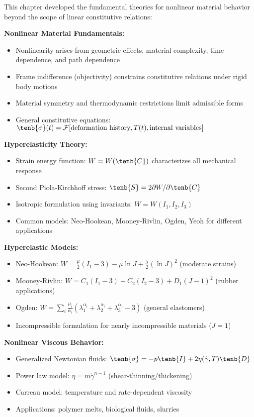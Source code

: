\begin{subox}[Summary]
This chapter developed the fundamental theories for nonlinear material behavior beyond the scope of linear constitutive relations:

\textbf{Nonlinear Material Fundamentals:}
\begin{itemize}
\item Nonlinearity arises from geometric effects, material complexity, time dependence, and path dependence
\item Frame indifference (objectivity) constrains constitutive relations under rigid body motions
\item Material symmetry and thermodynamic restrictions limit admissible forms
\item General constitutive equations: $\tenb{\sigma}(t) = \mathcal{F}[\text{deformation history}, T(t), \text{internal variables}]$
\end{itemize}

\textbf{Hyperelasticity Theory:}
\begin{itemize}
\item Strain energy function: $W = W(\tenb{C})$ characterizes all mechanical response
\item Second Piola-Kirchhoff stress: $\tenb{S} = 2\partial W/\partial \tenb{C}$
\item Isotropic formulation using invariants: $W = W(I_1, I_2, I_3)$
\item Common models: Neo-Hookean, Mooney-Rivlin, Ogden, Yeoh for different applications
\end{itemize}

\textbf{Hyperelastic Models:}
\begin{itemize}
\item Neo-Hookean: $W = \frac{\mu}{2}(I_1 - 3) - \mu \ln J + \frac{\lambda}{2}(\ln J)^2$ (moderate strains)
\item Mooney-Rivlin: $W = C_1(I_1 - 3) + C_2(I_2 - 3) + D_1(J - 1)^2$ (rubber applications)
\item Ogden: $W = \sum_i \frac{\mu_i}{\alpha_i}(\lambda_1^{\alpha_i} + \lambda_2^{\alpha_i} + \lambda_3^{\alpha_i} - 3)$ (general elastomers)
\item Incompressible formulation for nearly incompressible materials ($J = 1$)
\end{itemize}

\textbf{Nonlinear Viscous Behavior:}
\begin{itemize}
\item Generalized Newtonian fluids: $\tenb{\sigma} = -p\tenb{I} + 2\eta(\dot{\gamma}, T) \tenb{D}$
\item Power law model: $\eta = m\dot{\gamma}^{n-1}$ (shear-thinning/thickening)
\item Carreau model: temperature and rate-dependent viscosity
\item Applications: polymer melts, biological fluids, slurries
\end{itemize}


\end{subox}
